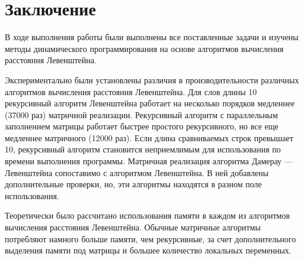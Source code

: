 \chapter*{Заключение}

В ходе выполнения работы были выполнены все поставленные задачи и изучены методы динамического программирования на основе алгоритмов вычисления расстояния Левенштейна.

Экспериментально были установлены различия в производительности различных алгоритмов вычисления расстояния Левенштейна. Для слов длины 10 рекурсивный алгоритм Левенштейна работает на несколько порядков медленнее (37000 раз) матричной реализации. Рекурсивный алгоритм с параллельным заполнением матрицы работает быстрее простого рекурсивного, но все еще медленнее матричного (12000 раз). Если длина сравниваемых строк превышает 10, рекурсивный алгоритм становится неприемлимым для использования по времени выполнения программы. Матричная реализация алгоритма Дамерау — Левенштейна сопоставимо с алгоритмом Левенштейна. В ней добавлены дополнительные проверки, но, эти алгоритмы находятся в разном поле использования.

Теоретически было рассчитано использования памяти в каждом из алгоритмов вычисления расстояния Левенштейна. Обычные матричные алгоритмы потребляют намного больше памяти, чем рекурсивные, за счет дополнительного выделения памяти под матрицы и большее количество локальных переменных.